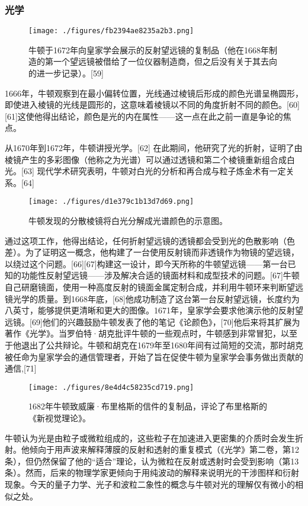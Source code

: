 \subsubsection{光学}
\begin{figure}[ht]
\centering
\texttt{[image: ./figures/fb2394ae8235a2b3.png]}
\caption{牛顿于1672年向皇家学会展示的反射望远镜的复制品（他在1668年制造的第一个望远镜被借给了一位仪器制造商，但之后没有关于其去向的进一步记录）。[59]} \label{fig_Newton_3}
\end{figure}
1666年，牛顿观察到在最小偏转位置，光线通过棱镜后形成的颜色光谱呈椭圆形，即使进入棱镜的光线是圆形的，这意味着棱镜以不同的角度折射不同的颜色。[60][61]这使他得出结论，颜色是光的内在属性——这一点在此之前一直是争论的焦点。

从1670年到1672年，牛顿讲授光学。[62] 在此期间，他研究了光的折射，证明了由棱镜产生的多彩图像（他称之为光谱）可以通过透镜和第二个棱镜重新组合成白光。[63] 现代学术研究表明，牛顿对白光的分析和再合成与粒子炼金术有一定关系。[64] 
\begin{figure}[ht]
\centering
\texttt{[image: ./figures/d1e379c1b13d7d69.png]}
\caption{牛顿发现的分散棱镜将白光分解成光谱颜色的示意图。} \label{fig_Newton_4}
\end{figure}
通过这项工作，他得出结论，任何折射望远镜的透镜都会受到光的色散影响（色差）。为了证明这一概念，他构建了一台使用反射镜而非透镜作为物镜的望远镜，以绕过这个问题。[66][67]构建这一设计，即今天所称的牛顿望远镜——第一台已知的功能性反射望远镜——涉及解决合适的镜面材料和成型技术的问题。[67]牛顿自己研磨镜面，使用一种高度反射的镜面金属定制合成，并利用牛顿环来判断望远镜光学的质量。到1668年底，[68]他成功制造了这台第一台反射望远镜，长度约为八英寸，能够提供更清晰和更大的图像。1671年，皇家学会要求他演示他的反射望远镜。[69]他们的兴趣鼓励牛顿发表了他的笔记《论颜色》，[70]他后来将其扩展为著作《光学》。当罗伯特·胡克批评牛顿的一些观点时，牛顿感到非常冒犯，以至于他退出了公共辩论。牛顿和胡克在1679年至1680年间有过简短的交流，那时胡克被任命为皇家学会的通信管理者，开始了旨在促使牛顿为皇家学会事务做出贡献的通信,[71]
\begin{figure}[ht]
\centering
\texttt{[image: ./figures/8e4d4c58235cd719.png]}
\caption{1682年牛顿致威廉·布里格斯的信件的复制品，评论了布里格斯的《新视觉理论》。} \label{fig_Newton_5}
\end{figure}
牛顿认为光是由粒子或微粒组成的，这些粒子在加速进入更密集的介质时会发生折射。他倾向于用声波来解释薄膜的反射和透射的重复模式（《光学》第二卷，第12条），但仍然保留了他的“适合”理论，认为微粒在反射或透射时会受到影响（第13条）。然而，后来的物理学家更倾向于用纯波动的解释来说明光的干涉图样和衍射现象。今天的量子力学、光子和波粒二象性的概念与牛顿对光的理解仅有微小的相似之处。

